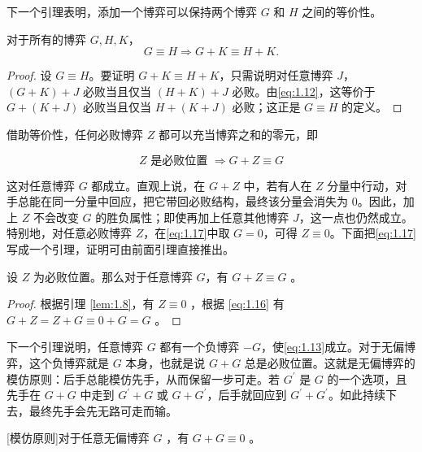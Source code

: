 下一个引理表明，添加一个博弈可以保持两个博弈 \(G\) 和 \(H\) 之间的等价性。
\begin{lemma}\label{lem:1.9}
 对于所有的博弈 \(G,H,K\)，
\begin{equation}
G \equiv  H \Rightarrow  G + K \equiv  H + K.  \label{eq:1.16}
\end{equation}
\end{lemma}

\begin{proof}
设 \(G \equiv H\)。要证明 \(G+K \equiv H+K\)，只需说明对任意博弈 \(J\)，\(\left({G+K}\right)+J\) 必败当且仅当 \(\left({H+K}\right)+J\) 必败。由\eqref{eq:1.12}，这等价于 \(G+\left({K+J}\right)\) 必败当且仅当 \(H+\left({K+J}\right)\) 必败；这正是 \(G\equiv H\) 的定义。
\end{proof}

借助等价性，任何必败博弈 \(Z\) 都可以充当博弈之和的零元，即

\begin{equation}
Z\text{ 是必败位置 } \Rightarrow  G + Z \equiv  G \label{eq:1.17}
\end{equation}

这对任意博弈 \(G\) 都成立。直观上说，在 \(G+Z\) 中，若有人在 \(Z\) 分量中行动，对手总能在同一分量中回应，把它带回必败结构，最终该分量会消失为 0。因此，加上 \(Z\) 不会改变 \(G\) 的胜负属性；即使再加上任意其他博弈 \(J\)，这一点也仍然成立。特别地，对任意必败博弈 \(Z\)，在\eqref{eq:1.17}中取 \(G=0\)，可得 \(Z\equiv 0\)。下面把\eqref{eq:1.17}写成一个引理，证明可由前面引理直接推出。

\begin{lemma}\label{lem:1.10}设 \(Z\) 为必败位置。那么对于任意博弈 \(G\)，有 \(G + Z \equiv  G\) 。\end{lemma}

\begin{proof}
根据引理 \ref{lem:1.8}，有 \(Z \equiv  0\) ，根据 \eqref{eq:1.16} 有 \(G + Z = Z + G \equiv  0 + G = G\) 。
\end{proof}

下一个引理说明，任意博弈 \(G\) 都有一个负博弈 \(-G\)，使\eqref{eq:1.13}成立。对于无偏博弈，这个负博弈就是 \(G\) 本身，也就是说 \(G+G\) 总是必败位置。这就是无偏博弈的模仿原则：后手总能模仿先手，从而保留一步可走。若 \({G}^{\prime}\) 是 \(G\) 的一个选项，且先手在 \(G+G\) 中走到 \({G}^{\prime}+G\) 或 \(G+{G}^{\prime}\)，后手就回应到 \({G}^{\prime}+{G}^{\prime}\)。如此持续下去，最终先手会先无路可走而输。

\begin{lemma}\label{lem:1.11}[模仿原则]对于任意无偏博弈 \(G\) ，有 \(G + G \equiv  0\) 。\end{lemma}

